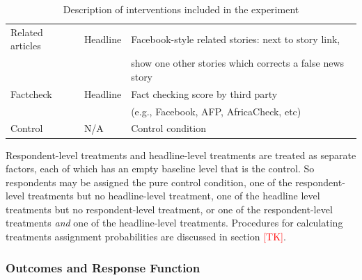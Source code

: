 \documentclass[letterpaper, 12pt, parskip=full,]{scrartcl}
\begin{document}
\begin{table}[H]
\begin{tabular}{l|l|l}
Related articles                                                                                                       & Headline                                                                                                     & Facebook-style related stories: next to story link,\\ & & show one other stories which corrects a false news story                                                                                                                                                                                                                                                                                             \\
Factcheck                                                                                                      & Headline                                                                                                     & Fact checking score by third party\\ & & (e.g., Facebook, AFP, AfricaCheck, etc)
 \\
Control                                                                                                        & N/A                                                                                                          & Control condition                                                                                                                                                                                                                                                                                                                                                                                              
\end{tabular}
\caption{Description of interventions included in the experiment}
\label{tab:treatments}
\end{table}

Respondent-level treatments and headline-level treatments are treated as separate factors, each of which has an empty baseline level that is the control. So respondents may be assigned the pure control condition, one of the respondent-level treatments but no headline-level treatment, one of the headline level treatments but no respondent-level treatment, or one of the respondent-level treatments \textit{and} one of the headline-level treatments. Procedures for calculating treatments assignment probabilities are discussed in section \textcolor{red}{[TK]}. 


\subsubsection{Outcomes and Response Function}
\end{document}
